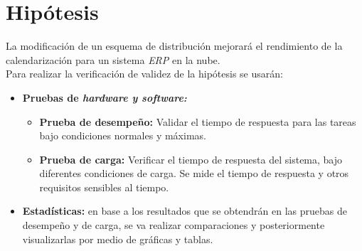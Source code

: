 \newpage

\section*{Hip\'otesis}

La modificaci\'on de un esquema de distribuci\'on mejorar\'a el rendimiento de la calendarizaci\'on para un sistema \textit{ERP} en la nube.\\

Para realizar la verificaci\'on de validez de la hip\'otesis se usar\'an:


\begin{itemize}
	\item \textbf{Pruebas de \textit{hardware y software:}}
	\begin{itemize}
	\item \textbf{Prueba de desempeño:} Validar el tiempo de respuesta para las tareas bajo condiciones normales y m\'aximas.
	\item \textbf{Prueba de carga:} Verificar el tiempo de respuesta del sistema, bajo diferentes condiciones de carga. Se mide el tiempo de respuesta y otros requisitos sensibles al tiempo.
	\end{itemize}
	\item \textbf{Estad\'isticas:} en base a los resultados que se obtendr\'an en las pruebas de desempeño y de carga, se va realizar comparaciones y posteriormente visualizarlas por medio de gr\'aficas y tablas.
\end{itemize}

